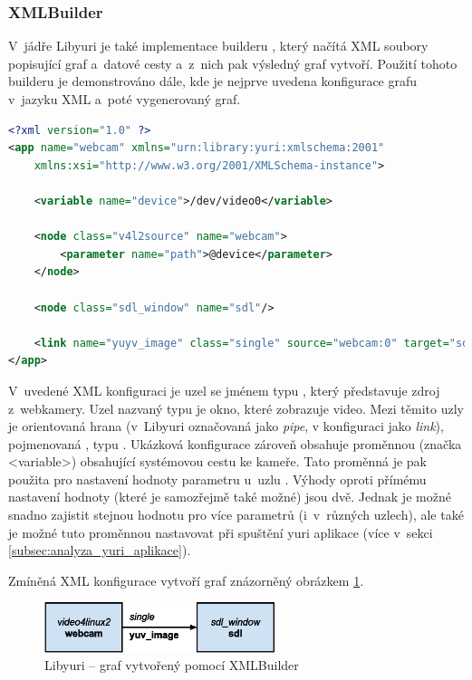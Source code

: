 \documentclass[thesis=M,czech]{FITthesis}[2012/06/26]
\begin{document}
\subsubsection{XMLBuilder} \label{subsec:analyza_yuri_vytvoreni_xml}
V~jádře Libyuri je také implementace builderu , který načítá XML soubory popisující graf a~datové cesty a~z~nich pak výsledný graf vytvoří. Použití tohoto builderu je demonstrováno dále, kde je nejprve uvedena konfigurace grafu v~jazyku XML a~poté vygenerovaný graf.
\\
\begin{minipage}{\linewidth}
\begin{lstlisting}[language=XML]
<?xml version="1.0" ?>
<app name="webcam" xmlns="urn:library:yuri:xmlschema:2001"
    xmlns:xsi="http://www.w3.org/2001/XMLSchema-instance">

    <variable name="device">/dev/video0</variable>    

    <node class="v4l2source" name="webcam">
        <parameter name="path">@device</parameter>
    </node>
    
    <node class="sdl_window" name="sdl"/>

    <link name="yuyv_image" class="single" source="webcam:0" target="sdl:0"/>
</app>
\end{lstlisting}
\end{minipage}
V~uvedené XML konfiguraci je uzel se jménem  typu , který představuje zdroj z~webkamery. Uzel nazvaný  typu  je okno, které zobrazuje video. Mezi těmito uzly je orientovaná hrana (v~Libyuri označovaná jako \textit{pipe}, v konfiguraci jako \textit{link}), pojmenovaná , typu . Ukázková konfigurace zároveň obsahuje proměnnou (značka <variable>) obsahující systémovou cestu ke kameře. Tato proměnná je pak použita pro nastavení hodnoty parametru  u~uzlu . Výhody oproti přímému nastavení hodnoty (které je samozřejmě také možné) jsou dvě. Jednak je možné snadno zajistit stejnou hodnotu pro více parametrů (i~v~různých uzlech), ale také je možné tuto proměnnou nastavovat při spuštění yuri aplikace (více v~sekci \ref{subsec:analyza_yuri_aplikace}). 

Zmíněná XML konfigurace vytvoří graf znázorněný obrázkem \ref{img:yuri_vytvoreni_xml}.
\\
\begin{figure}[h]\centering
	\includegraphics[width=0.6\textwidth]{images/yuri_xml_graph.eps}
	\caption{Libyuri -- graf vytvořený pomocí XMLBuilder}\label{img:yuri_vytvoreni_xml}
\end{figure}
\end{document}
